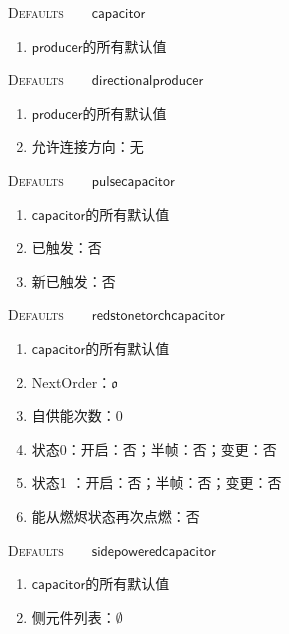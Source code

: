 \documentclass[a4,11pt]{aleph-notas}
\begin{document}
\begin{codigo}
\textsc{Defaults}\ \ \ \ $\mathsf{capacitor}$
\begin{enumerate}
  \setlength{\itemsep}{1pt}
  \setlength{\parskip}{0pt}
  \setlength{\parsep}{0pt}
    \item $\mathsf{producer}$的所有默认值
\end{enumerate}
\end{codigo}

\begin{codigo}
\textsc{Defaults}\ \ \ \ $\mathsf{directionalproducer}$
\begin{enumerate}
  \setlength{\itemsep}{1pt}
  \setlength{\parskip}{0pt}
  \setlength{\parsep}{0pt}
    \item $\mathsf{producer}$的所有默认值
    \item 允许连接方向：无
\end{enumerate}
\end{codigo}

\begin{codigo}
\textsc{Defaults}\ \ \ \ $\mathsf{pulsecapacitor}$
\begin{enumerate}
  \setlength{\itemsep}{1pt}
  \setlength{\parskip}{0pt}
  \setlength{\parsep}{0pt}
    \item $\mathsf{capacitor}$的所有默认值
    \item 已触发：否
    \item 新已触发：否
\end{enumerate}
\end{codigo}

\begin{codigo}
\textsc{Defaults}\ \ \ \ $\mathsf{redstonetorchcapacitor}$
\begin{enumerate}
  \setlength{\itemsep}{1pt}
  \setlength{\parskip}{0pt}
  \setlength{\parsep}{0pt}
    \item $\mathsf{capacitor}$的所有默认值
    \item NextOrder：$\mathfrak{o}$
    \item 自供能次数：$0$
    \item 状态0：开启：否；半帧：否；变更：否
    \item 状态1 ：开启：否；半帧：否；变更：否
    \item 能从燃烬状态再次点燃：否
\end{enumerate}
\end{codigo}

\begin{codigo}
\textsc{Defaults}\ \ \ \ $\mathsf{sidepoweredcapacitor}$
\begin{enumerate}
  \setlength{\itemsep}{1pt}
  \setlength{\parskip}{0pt}
  \setlength{\parsep}{0pt}
    \item $\mathsf{capacitor}$的所有默认值
    \item 侧元件列表：$\emptyset$
\end{enumerate}
\end{codigo}
\end{document}
